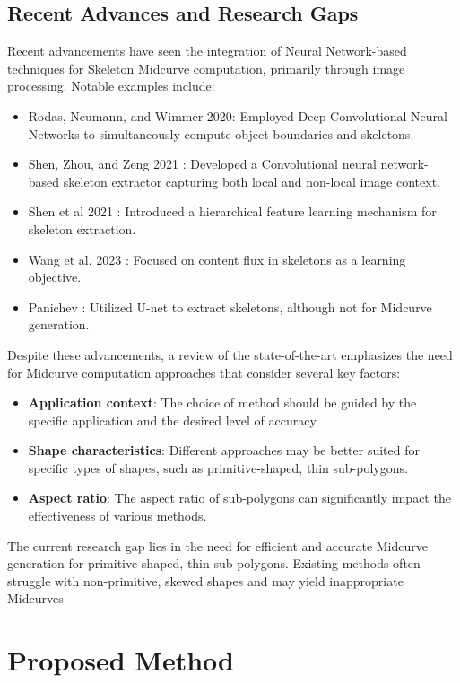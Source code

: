 \documentclass[conference]{IEEEtran}
\begin{document}
\subsection{Recent Advances and Research Gaps}
\label{subsec:2}

Recent advancements have seen the integration of Neural Network-based techniques for Skeleton Midcurve computation, primarily through image processing. Notable examples include:
\begin{itemize}
\item Rodas, Neumann, and Wimmer 2020\cite{Rodas2019JointOB}: Employed Deep Convolutional Neural Networks to simultaneously compute object boundaries and skeletons.
\item Shen, Zhou, and Zeng 2021 \cite{shen2021convolutional}: Developed a Convolutional neural network-based skeleton extractor capturing both local and non-local image context.
\item Shen et al 2021 \cite{shen2016object}: Introduced a hierarchical feature learning mechanism for skeleton extraction.
\item Wang et al. 2023 \cite{wang2018deepflux}: Focused on content flux in skeletons as a learning objective.
\item Panichev \cite{Panichev_2019_CVPR_Workshops}: Utilized U-net to extract skeletons, although not for Midcurve generation.
\end{itemize}

Despite these advancements, a review of the state-of-the-art emphasizes the need for Midcurve computation approaches that consider several key factors:
\begin{itemize}
\item {\bf Application context}: The choice of method should be guided by the specific application and the desired level of accuracy.
\item {\bf Shape characteristics}: Different approaches may be better suited for specific types of shapes, such as primitive-shaped, thin sub-polygons.
\item {\bf Aspect ratio}: The aspect ratio of sub-polygons can significantly impact the effectiveness of various methods.
\end{itemize}
The current research gap lies in the need for efficient and accurate Midcurve generation for primitive-shaped, thin sub-polygons. Existing methods often struggle with non-primitive, skewed shapes and may yield inappropriate Midcurves


\section{Proposed Method}
\label{sec:3}
\end{document}
